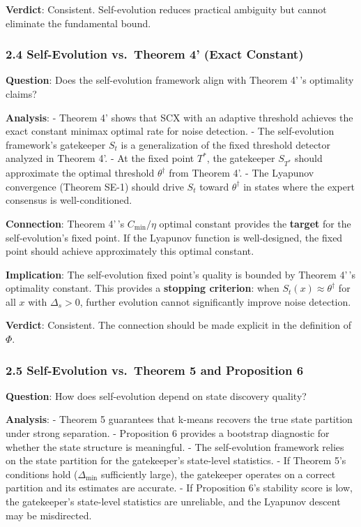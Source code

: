 \documentclass[
  12pt,
]{article}
\begin{document}
\textbf{Verdict}: Consistent. Self-evolution reduces practical ambiguity
but cannot eliminate the fundamental bound.

\subsubsection{2.4 Self-Evolution vs.~Theorem 4' (Exact
Constant)}\label{self-evolution-vs.-theorem-4-exact-constant}

\textbf{Question}: Does the self-evolution framework align with Theorem
4'\,'s optimality claims?

\textbf{Analysis}: - Theorem 4' shows that SCX with an adaptive
threshold achieves the exact constant minimax optimal rate for noise
detection. - The self-evolution framework's gatekeeper \(S_t\) is a
generalization of the fixed threshold detector analyzed in Theorem 4'. -
At the fixed point \(T^*\), the gatekeeper \(S_{T^*}\) should
approximate the optimal threshold \(\theta^\dagger\) from Theorem 4'. -
The Lyapunov convergence (Theorem SE-1) should drive \(S_t\) toward
\(\theta^\dagger\) in states where the expert consensus is
well-conditioned.

\textbf{Connection}: Theorem 4'\,'s \(C_{\min}/\eta\) optimal constant
provides the \textbf{target} for the self-evolution's fixed point. If
the Lyapunov function is well-designed, the fixed point should achieve
approximately this optimal constant.

\textbf{Implication}: The self-evolution fixed point's quality is
bounded by Theorem 4'\,'s optimality constant. This provides a
\textbf{stopping criterion}: when \(S_t(x) \approx \theta^\dagger\) for
all \(x\) with \(\Delta_s > 0\), further evolution cannot significantly
improve noise detection.

\textbf{Verdict}: Consistent. The connection should be made explicit in
the definition of \(\Phi\).

\subsubsection{2.5 Self-Evolution vs.~Theorem 5 and Proposition
6}\label{self-evolution-vs.-theorem-5-and-proposition-6}

\textbf{Question}: How does self-evolution depend on state discovery
quality?

\textbf{Analysis}: - Theorem 5 guarantees that k-means recovers the true
state partition under strong separation. - Proposition 6 provides a
bootstrap diagnostic for whether the state structure is meaningful. -
The self-evolution framework relies on the state partition for the
gatekeeper's state-level statistics. - If Theorem 5's conditions hold
(\(\Delta_{\min}\) sufficiently large), the gatekeeper operates on a
correct partition and its estimates are accurate. - If Proposition 6's
stability score is low, the gatekeeper's state-level statistics are
unreliable, and the Lyapunov descent may be misdirected.
\end{document}
